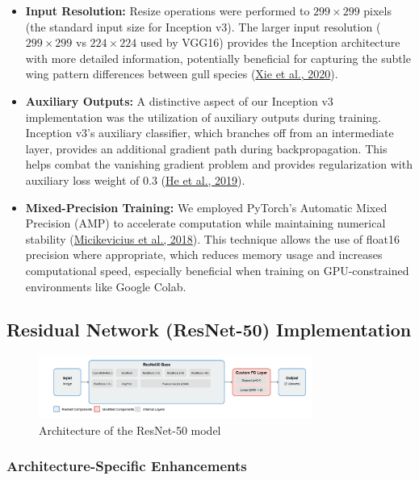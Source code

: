 \documentclass[a4paper,12pt]{report}
\begin{document}
\begin{itemize}
    \item \textbf{Input Resolution:} Resize operations were performed to $299\times299$ pixels (the standard input size for Inception v3). The larger input resolution ($299\times299$ vs $224\times224$ used by VGG16) provides the Inception architecture with more detailed information, potentially beneficial for capturing the subtle wing pattern differences between gull species (\href{https://arxiv.org/abs/1911.0907}{Xie et al., 2020}).
    
    \item \textbf{Auxiliary Outputs:} A distinctive aspect of our Inception v3 implementation was the utilization of auxiliary outputs during training. Inception v3's auxiliary classifier, which branches off from an intermediate layer, provides an additional gradient path during backpropagation. This helps combat the vanishing gradient problem and provides regularization with auxiliary loss weight of 0.3 (\href{https://arxiv.org/abs/1902.04103}{He et al., 2019}).
    
    \item \textbf{Mixed-Precision Training:} We employed PyTorch's Automatic Mixed Precision (AMP) to accelerate computation while maintaining numerical stability (\href{https://arxiv.org/abs/1710.03740}{Micikevicius et al., 2018}). This technique allows the use of float16 precision where appropriate, which reduces memory usage and increases computational speed, especially beneficial when training on GPU-constrained environments like Google Colab.
\end{itemize}

\subsection{Residual Network (ResNet-50) Implementation}

\begin{figure}[h]
    \centering
    \includegraphics[width=0.8\textwidth]{images/architecture/resnet.png}
    \caption{Architecture of the ResNet-50 model}
    \label{fig:resnet_architecture}
\end{figure}

\subsubsection{Architecture-Specific Enhancements}
\end{document}
